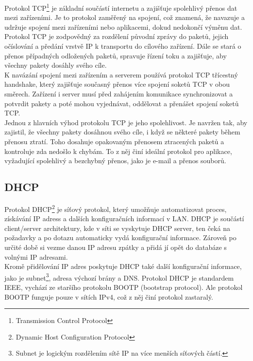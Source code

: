 \documentclass[12pt]{report}			%
\begin{document}
				
Protokol TCP\footnote{Transmission Control Protocol} je základní součástí internetu a zajišťuje spolehlivý přenos dat mezi zařízeními. Je to protokol zaměřený na spojení, což znamená, že navazuje a udržuje spojení mezi zařízeními nebo aplikacemi, dokud nedokončí výměnu dat.
\\
Protokol TCP je zodpovědný za rozdělení původní zprávy do paketů, jejich očíslování a předání vrstvě IP k transportu do cílového zařízení. Dále se stará o přenos případných odložených paketů, spravuje řízení toku a zajišťuje, aby všechny pakety dosáhly svého cíle.
\\
K navázání spojení mezi zařízením a serverem používá protokol TCP třícestný handshake, který zajišťuje současný přenos více spojení soketů TCP v obou směrech. Zařízení i server musí před zahájením komunikace synchronizovat a potvrdit pakety a poté mohou vyjednávat, oddělovat a přenášet spojení soketů TCP.
\\
Jednou z hlavních výhod protokolu TCP je jeho spolehlivost. Je navržen tak, aby zajistil, že všechny pakety dosáhnou svého cíle, i když se některé pakety během přenosu ztratí. Toho dosahuje opakovaným přenosem ztracených paketů a kontroluje zda nedošlo k chybám. To z něj činí ideální protokol pro aplikace, vyžadující spolehlivý a bezchybný přenos, jako je e-mail a přenos souborů.\cite{Pruvodce}\cite{TCP}\cite{TCP1}\cite{TCP2}



				\subsection{DHCP}
				
				
Protokol DHCP\footnote{Dynamic Host Configuration Protocol} je síťový protokol, který umožňuje automatizovat proces, získávání IP adress a dalších konfiguračních informací v LAN. DHCP je součástí client/server architektury, kde v síti se vyskytuje DHCP server, ten čeká na požadavky a po dotazu automaticky vydá konfigurační informace. Zároveň po určité době si vezme danou IP adresu zpátky a přidá jí opět do databáze s volnými IP adresami. 
\\
Kromě přidělování IP adres poskytuje DHCP také další  konfigurační informace, jako je subnet\footnote{Subnet je logickým rozdělením sítě IP na více menších síťových částí.}, adresa výchozí brány a DNS. Protokol DHCP je standardem IEEE, vychází ze staršího protokolu BOOTP (bootstrap protocol). Ale protokol BOOTP funguje pouze v sítích IPv4, což z něj činí protokol zastaralý.\cite{DHCP1}\cite{DHCP2}\cite{DHCP3}\cite{DHCP4}
\end{document}
